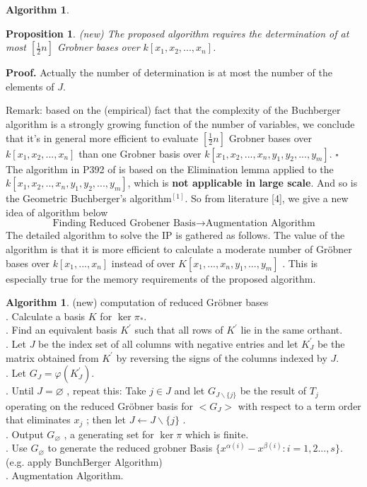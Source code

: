\documentclass{article}
\theoremstyle{plain}
\newtheorem{proposition}[theorem]{Proposition}
\theoremstyle{definition}
\newtheorem{algorithm}[theorem]{Algorithm}
\begin{document}
\begin{algorithm}
\begin{proposition}(new) The proposed algorithm requires the determination of at most $[\frac{1}{2}n]$ Grobner bases over $k[x_1,x_2,...,x_n]$. \end{proposition}

\noindent\textbf{Proof. }Actually the number of determination is at most the number of the elements of $J$.

Remark: based on the (empirical) fact that the complexity of the
Buchberger algorithm is a strongly growing function of the number of variables, we conclude that it's in general more efficient to evaluate $[\frac{1}{2}n]$ Grobner bases over $k[x_1,x_2,...,x_n]$ than one Grobner basis over $k[x_1,x_2,...,x_n,y_1,y_2,...,y_m]$. \hfill $\square$\\

The algorithm in P392 of \cite{ref2} is based on the Elimination lemma applied to the  $k[x_1,x_2,..,x_n,y_1,y_2,...,y_m]$, which is \textbf{not applicable in large scale}. And so is the  Geometric Buchberger’s algorithm$^{[1]}$. So from literature [4], we give a new idea of algorithm below
$$\text{Finding Reduced Grobener Basis}\to \text{Augmentation Algorithm}$$
The detailed algorithm to solve the IP is gathered as follows. The value of the algorithm is that it is more efficient to calculate a moderate number of Gröbner bases over  $k[x_1,...,x_n]$  instead of  over  $K[x_1,...,x_n, y_1,...,y_m]$ . This is especially true for the memory requirements of the proposed algorithm.\\

\begin{algorithm}(new) computation of reduced Gröbner bases \\
. Calculate a basis $K$ for $\operatorname{ker} \pi_{*}$. \\
. Find an equivalent basis  $K^{\prime}$  such that all rows of  $K^{\prime}$  lie in the same orthant. \\
. Let  $J$  be the index set of all columns with negative entries and let  $K_{J}^{\prime}$  be the matrix obtained from  $K^{\prime}$  by reversing the signs of the columns indexed by  $J$.  \\
. Let $G_{J}=\varphi\left(K_{J}^{\prime}\right)$. \\
. Until  $J=\varnothing$ , repeat this: Take  $j \in J$  and let  $G_{J \backslash\{j\}}$  be the result of $T_{j}$ operating on the reduced Gröbner basis for  $<G_{J}>$ with respect to a term order that eliminates  $x_{j}$ ; then let  $J \leftarrow   J \backslash\{j\}$ . \\
. Output  $G_{\varnothing}$ , a generating set for  $\operatorname{ker} \pi $ which is finite.\\
. Use $G_{\varnothing}$ to generate the reduced grobner Basis $\{x^{\alpha(i)}-x^{\beta(i)}:i=1,2...,s\}$. (e.g. apply BunchBerger Algorithm)\\
. Augmentation Algorithm. \end{algorithm}


\end{algorithm}
\end{document}
